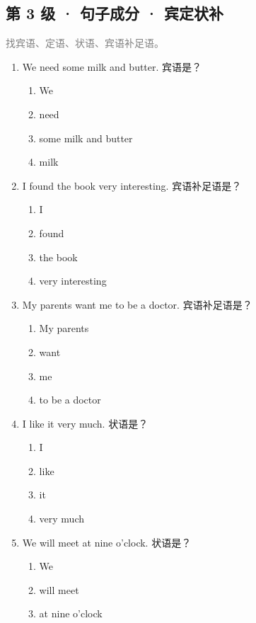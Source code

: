 \documentclass[11pt,a4paper]{ctexart}
\begin{document}
\subsection*{第 3 级 · 句子成分 · 宾定状补}
\noindent\textcolor{gray}{找宾语、定语、状语、宾语补足语。}\par\smallskip
\begin{enumerate}[leftmargin=*,itemsep=4pt]
\item We need some milk and butter. 宾语是？
\begin{enumerate}[label=\Alph*.,leftmargin=2em,itemsep=1pt,topsep=2pt]
\item We
\item need
\item some milk and butter
\item milk
\end{enumerate}
\item I found the book very interesting. 宾语补足语是？
\begin{enumerate}[label=\Alph*.,leftmargin=2em,itemsep=1pt,topsep=2pt]
\item I
\item found
\item the book
\item very interesting
\end{enumerate}
\item My parents want me to be a doctor. 宾语补足语是？
\begin{enumerate}[label=\Alph*.,leftmargin=2em,itemsep=1pt,topsep=2pt]
\item My parents
\item want
\item me
\item to be a doctor
\end{enumerate}
\item I like it very much. 状语是？
\begin{enumerate}[label=\Alph*.,leftmargin=2em,itemsep=1pt,topsep=2pt]
\item I
\item like
\item it
\item very much
\end{enumerate}
\item We will meet at nine o’clock. 状语是？
\begin{enumerate}[label=\Alph*.,leftmargin=2em,itemsep=1pt,topsep=2pt]
\item We
\item will meet
\item at nine o’clock

\end{enumerate}
\end{enumerate}
\end{document}
